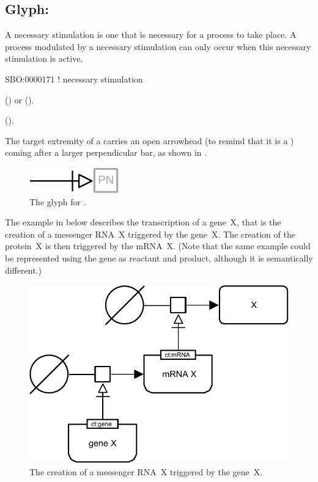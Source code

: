 \subsection{Glyph: }
\label{sec:necessary_stim}

A necessary stimulation is one that is necessary for a process to take place. A process modulated by a necessary stimulation can only occur when this necessary stimulation is active.

\begin{glyphDescription}

\glyphSboTerm
SBO:0000171 ! necessary stimulation

\glyphOrigin
{}  () or   ().

\glyphTarget
{}  ().

\glyphSymbol
The target extremity of a  carries an open arrowhead (to remind that it is a ) coming after a larger perpendicular bar, as shown in .

\end{glyphDescription}

\begin{figure}[H]
  \centering
  \includegraphics{images/necessary_stim}
  \caption{The \PD glyph for .}
  \label{fig:Necessary Stimulation}
\end{figure}

The example in  below describes the transcription of a gene~X, that is the creation of a messenger RNA~X triggered by the gene~X.  The creation of the protein~X is then triggered by the mRNA~X.  (Note that the same example could be represented using the gene as reactant and product, although it is semantically different.)

\begin{figure}[H]
  \centering
  \includegraphics[scale = 0.8]{examples/necessary_stim-genetic}
  \caption{The creation of a messenger RNA~X triggered by the gene~X.}
  \label{fig:necessary_stim-gene}
\end{figure}

